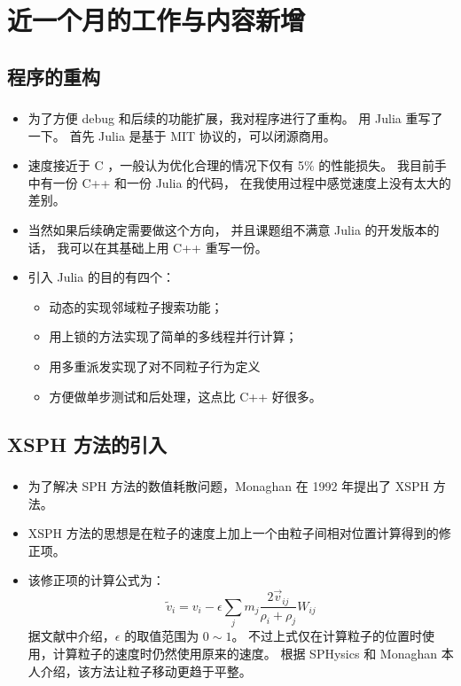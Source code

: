 \section{近一个月的工作与内容新增}

\subsection{程序的重构}

\begin{frame}
    \frametitle{\subsecname}
    \begin{itemize}
        \item 为了方便 debug 和后续的功能扩展，我对程序进行了重构。
        用 Julia 重写了一下。
        首先 Julia 是基于 MIT 协议的，可以闭源商用。
        \item 速度接近于 C ，一般认为优化合理的情况下仅有 5\% 的性能损失。
        我目前手中有一份 C++ 和一份 Julia 的代码，
        在我使用过程中感觉速度上没有太大的差别。
        \item 当然如果后续确定需要做这个方向，
        并且课题组不满意 Julia 的开发版本的话，
        我可以在其基础上用 C++ 重写一份。
        \item 引入 Julia 的目的有四个：
        \begin{itemize}
            \item 动态的实现邻域粒子搜索功能；
            \item 用上锁的方法实现了简单的多线程并行计算；
            \item 用多重派发实现了对不同粒子行为定义
            \item 方便做单步测试和后处理，这点比 C++ 好很多。
        \end{itemize}
    \end{itemize}
\end{frame}

\subsection{XSPH 方法的引入}

\begin{frame}
    \frametitle{\subsecname}
    \begin{itemize}
        \item 为了解决 SPH 方法的数值耗散问题，Monaghan 在 1992 年提出了 XSPH 方法。
        \item XSPH 方法的思想是在粒子的速度上加上一个由粒子间相对位置计算得到的修正项。
        \item 该修正项的计算公式为：
        \begin{equation}
            \tilde{v}_i = v_i - \epsilon \sum_j m_j \frac{2\vec{v}_{ij}}{\rho_i+\rho_j} W_{ij}
        \end{equation}
        据文献中介绍，$\epsilon$ 的取值范围为 $0\sim 1$。
        不过上式仅在计算粒子的位置时使用，计算粒子的速度时仍然使用原来的速度。
        根据 SPHysics 和 Monaghan 本人介绍，该方法让粒子移动更趋于平整。
    \end{itemize}
\end{frame}

